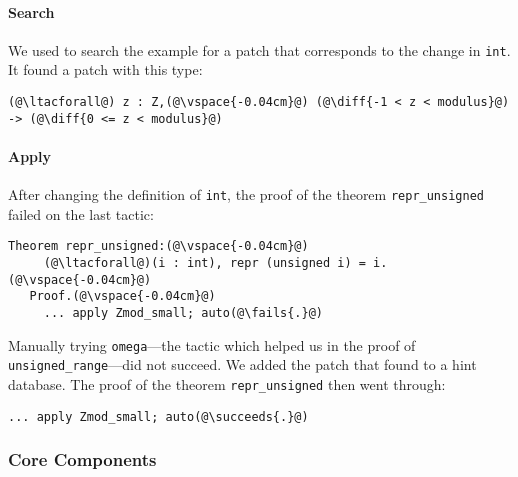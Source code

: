 \paragraph{Search} We used \sysname to search the example for a patch that corresponds to the change in \lstinline{int}. It found
a patch with this type:

\begin{lstlisting}[language=coq]
   (@\ltacforall@) z : Z,(@\vspace{-0.04cm}@) (@\diff{-1 < z < modulus}@) -> (@\diff{0 <= z < modulus}@)
\end{lstlisting}

\paragraph{Apply} After changing the definition of \lstinline{int}, the proof of the
theorem \lstinline{repr_unsigned} failed on the last tactic:

\begin{lstlisting}[language=coq]
   Theorem repr_unsigned:(@\vspace{-0.04cm}@)
     (@\ltacforall@)(i : int), repr (unsigned i) = i.(@\vspace{-0.04cm}@)
   Proof.(@\vspace{-0.04cm}@)
     ... apply Zmod_small; auto(@\fails{.}@)
\end{lstlisting}

Manually trying \lstinline{omega}---the tactic which helped us in the proof of \lstinline{unsigned_range}---did not
succeed.
We added the patch that \sysname found to a hint database.
The proof of the theorem \lstinline{repr_unsigned} then went through:

\begin{lstlisting}[language=coq]
    ... apply Zmod_small; auto(@\succeeds{.}@)
\end{lstlisting}

\subsubsection{Core Components}


